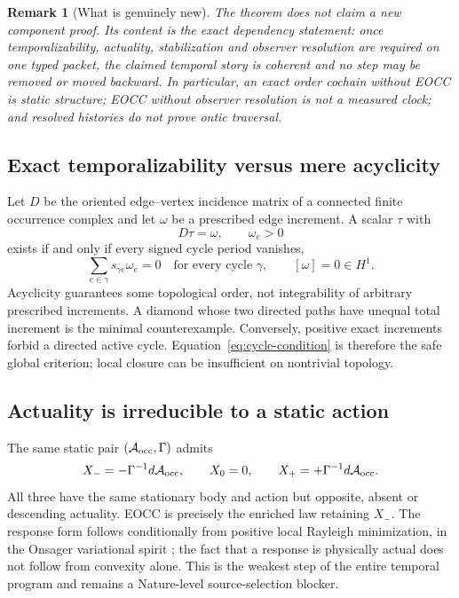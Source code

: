 \documentclass[11pt]{article}
\newtheorem{remark}{Remark}
\begin{document}
\begin{remark}[What is genuinely new]
The theorem does not claim a new component proof.  Its content is the exact
dependency statement: once temporalizability, actuality, stabilization and
observer resolution are required on one typed packet, the claimed temporal
story is coherent and no step may be removed or moved backward.  In
particular, an exact order cochain without EOCC is static structure; EOCC
without observer resolution is not a measured clock; and resolved histories
do not prove ontic traversal.
\end{remark}

\subsection{Exact temporalizability versus mere acyclicity}

Let \(D\) be the oriented edge--vertex incidence matrix of a connected finite
occurrence complex and let \(\omega\) be a prescribed edge increment.  A
scalar \(\tau\) with
\begin{equation}
 D\tau=\omega,
 \qquad \omega_e>0
 \label{eq:discrete-time}
\end{equation}
exists if and only if every signed cycle period vanishes,
\begin{equation}
 \sum_{e\in\gamma}s_{\gamma e}\omega_e=0
 \quad\text{for every cycle }\gamma,
 \qquad [\omega]=0\in H^1.
 \label{eq:cycle-condition}
\end{equation}
Acyclicity guarantees some topological order, not integrability of arbitrary
prescribed increments.  A diamond whose two directed paths have unequal total
increment is the minimal counterexample.  Conversely, positive exact
increments forbid a directed active cycle.  Equation~\eqref{eq:cycle-condition}
is therefore the safe global criterion; local closure can be insufficient on
nontrivial topology.

\subsection{Actuality is irreducible to a static action}

The same static pair \((\mathcal A_{\rm occ},\Gamma)\) admits
\begin{equation}
 X_-=-\Gamma^{-1}d\mathcal A_{\rm occ},
 \qquad X_0=0,
 \qquad X_+=+\Gamma^{-1}d\mathcal A_{\rm occ}.
 \label{eq:actuality-counterfamily}
\end{equation}
All three have the same stationary body and action but opposite, absent or
descending actuality.  EOCC is precisely the enriched law retaining
\(X_-\).  The response form follows conditionally from positive local
Rayleigh minimization, in the Onsager variational spirit
\citep{Onsager1931}; the fact that a response is physically actual does not
follow from convexity alone.  This is the weakest step of the entire temporal
program and remains a Nature-level source-selection blocker.
\end{document}
